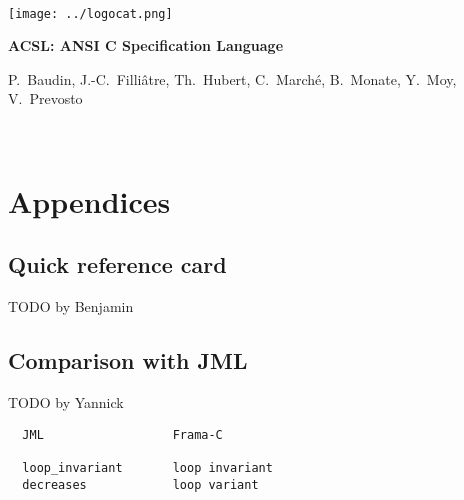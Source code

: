\documentclass[a4paper,11pt,twoside,openright]{report}
\begin{document}
\sloppy

\begin{titlepage}
\begin{center}
~\vfill

\texttt{[image: ../logocat.png]}

\vspace{20mm}

{\Huge\bfseries ACSL: ANSI C Specification Language}

\vspace{20mm}

{P.~Baudin, J.-C.~Filli\^atre, Th.~Hubert,
  C.~March\'e, B.~Monate, Y.~Moy, V.~Prevosto}

\vfill ~
\end{center}
\end{titlepage}

\clearpage
\label{chap:contents}
\tableofcontents







\appendix

\chapter{Appendices}

\section{Quick reference card}

TODO by Benjamin

\section{Comparison with JML}

TODO by Yannick

\begin{verbatim}
  JML                  Frama-C

  loop_invariant       loop invariant 
  decreases            loop variant

\end{verbatim}

\cleardoublepage
{}


\cleardoublepage
{}
\listoffigures

\cleardoublepage
{}
\printindex
\end{document}
